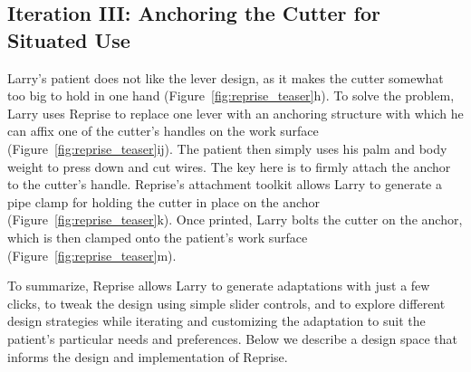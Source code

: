 \subsection{Iteration III: Anchoring the Cutter for Situated Use}
Larry's patient does not like the lever design, as it  makes the cutter somewhat too big to hold in one hand (Figure~\ref{fig:reprise_teaser}h). To solve the problem, Larry uses Reprise to replace one lever with an anchoring structure with which he can affix one of the cutter's handles on the work surface (Figure~\ref{fig:reprise_teaser}ij). The patient then simply uses his palm and body weight to press down and cut wires. The key here is to firmly attach the anchor to the cutter's handle. Reprise's attachment toolkit allows Larry to generate a pipe clamp for holding the cutter in place on the anchor (Figure~\ref{fig:reprise_teaser}k). Once printed, Larry bolts the cutter on the anchor, which is then clamped onto the patient's work surface (Figure~\ref{fig:reprise_teaser}m).

To summarize, Reprise allows Larry to generate adaptations with just a few clicks, to tweak the design using simple slider controls, and to explore different design strategies while iterating and customizing the adaptation to suit the patient's particular needs and preferences. Below we describe a design space that informs the design and implementation of Reprise.

